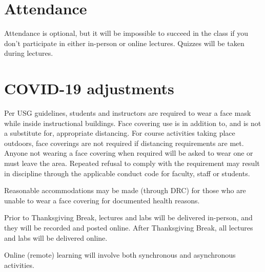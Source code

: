 \documentclass[12pt]{article}
\begin{document}
\section*{\normalsize Attendance}
\vspace{-4mm}
Attendance is optional, but it will be impossible to succeed in the
class if you don't participate in either in-person or online
lectures. Quizzes will be taken during lectures.  

\vspace{-2mm}
\section*{\normalsize COVID-19 adjustments}
\vspace{-4mm}
Per USG guidelines, students and instructors are required to wear a
face mask while inside instructional buildings. Face covering use is
in addition to, and is not a substitute for, appropriate
distancing. For course activities taking place outdoors, face
coverings are not required if distancing requirements are met. Anyone
not wearing a face covering when required will be asked to wear one or
must leave the area. Repeated refusal to comply with the requirement
may result in discipline through the applicable conduct code for
faculty, staff or students.

Reasonable accommodations may be made (through DRC) for those who are
unable to wear a face covering for documented health reasons. 

Prior to Thanksgiving Break, lectures and labs will be delivered
in-person, and they will be recorded and posted online. After
Thanksgiving Break, all lectures and labs will be delivered online. 

Online (remote) learning will involve both synchronous and
asynchronous activities.

\vspace{-2mm}
\end{document}

